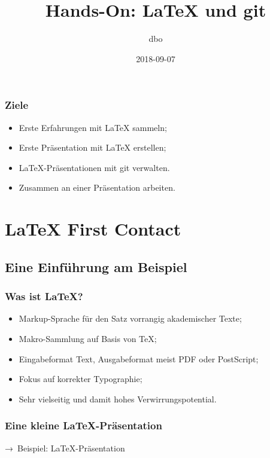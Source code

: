\documentclass{cms-kurs}
\begin{document}
\title{Hands-On: \LaTeX{} und git}
\author{dbo}
\date{2018-09-07}

\maketitle

\begin{frame}
  \frametitle{Ziele}

  \onslide<+->

  \begin{itemize}
  \item Erste Erfahrungen mit \LaTeX{} sammeln;
  \item Erste Präsentation mit \LaTeX{} erstellen;
  \item \LaTeX{}-Präsentationen mit git verwalten.
  \item Zusammen an einer Präsentation arbeiten.
  \end{itemize}

\end{frame}

\section{\LaTeX{} First Contact}

\subsection{Eine Einführung am Beispiel}

\begin{frame}
  \frametitle{Was ist \LaTeX?}

  \onslide<+->

  \begin{itemize}
  \item Markup-Sprache für den Satz vorrangig akademischer Texte;
  \item Makro-Sammlung auf Basis von \TeX{};
  \item Eingabeformat Text, Ausgabeformat meist PDF oder PostScript;
  \item Fokus auf korrekter Typographie;
  \item Sehr vielseitig und damit hohes Verwirrungspotential.
  \end{itemize}

\end{frame}

\begin{frame}
  \frametitle{Eine kleine \LaTeX-Präsentation}

  \onslide<+->

  → Beispiel: \LaTeX{}-Präsentation

\end{frame}
\end{document}
